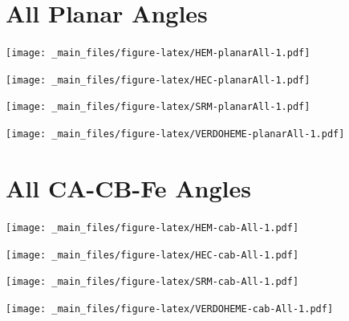 \documentclass[a4paper, nobind]{templates/ociamthesis}
\let\origfigure\figure
\let\endorigfigure\endfigure
\renewenvironment{figure}[1][2] {
    \expandafter\origfigure\expandafter[H]
} {
    \endorigfigure
}
\begin{document}
\hypertarget{figs-planarAll}{%
\section{All Planar Angles}\label{figs-planarAll}}

\begin{figure}
\centering
\texttt{[image: \_main\_files/figure-latex/HEM-planarAll-1.pdf]}
\caption{\label{fig:HEM-planarAll}HEM: All Planar Angles}
\end{figure}

\begin{figure}
\centering
\texttt{[image: \_main\_files/figure-latex/HEC-planarAll-1.pdf]}
\caption{\label{fig:HEC-planarAll}HEC: All Planar Angles}
\end{figure}

\begin{figure}
\centering
\texttt{[image: \_main\_files/figure-latex/SRM-planarAll-1.pdf]}
\caption{\label{fig:SRM-planarAll}SRM: All Planar Angles}
\end{figure}

\begin{figure}
\centering
\texttt{[image: \_main\_files/figure-latex/VERDOHEME-planarAll-1.pdf]}
\caption{\label{fig:VERDOHEME-planarAll}VERDOHEME: All Planar Angles}
\end{figure}

\hypertarget{figs-cabAll}{%
\section{All CA-CB-Fe Angles}\label{figs-cabAll}}

\begin{figure}
\centering
\texttt{[image: \_main\_files/figure-latex/HEM-cab-All-1.pdf]}
\caption{\label{fig:HEM-cab-All}HEM: All CA-CB-Fe Angles}
\end{figure}

\begin{figure}
\centering
\texttt{[image: \_main\_files/figure-latex/HEC-cab-All-1.pdf]}
\caption{\label{fig:HEC-cab-All}HEC: All CA-CB-Fe Angles}
\end{figure}

\begin{figure}
\centering
\texttt{[image: \_main\_files/figure-latex/SRM-cab-All-1.pdf]}
\caption{\label{fig:SRM-cab-All}SRM: All CA-CB-Fe Angles}
\end{figure}

\begin{figure}
\centering
\texttt{[image: \_main\_files/figure-latex/VERDOHEME-cab-All-1.pdf]}
\caption{\label{fig:VERDOHEME-cab-All}VERDOHEME: All CA-CB-Fe Angles}
\end{figure}
\end{document}
